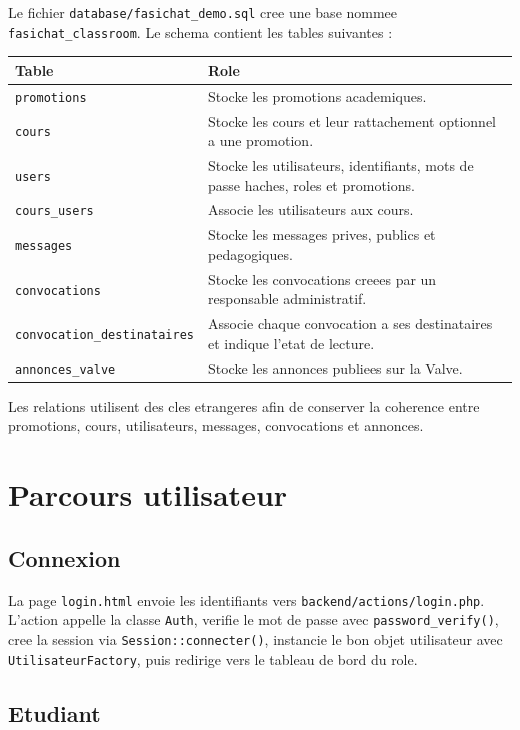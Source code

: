 \documentclass[12pt,a4paper]{article}
\begin{document}
Le fichier \texttt{database/fasichat\_demo.sql} cree une base nommee \texttt{fasichat\_classroom}. Le schema contient les tables suivantes :

\begin{longtable}{|p{4.5cm}|p{9.5cm}|}
\hline
\textbf{Table} & \textbf{Role} \\
\hline
\texttt{promotions} & Stocke les promotions academiques. \\
\hline
\texttt{cours} & Stocke les cours et leur rattachement optionnel a une promotion. \\
\hline
\texttt{users} & Stocke les utilisateurs, identifiants, mots de passe haches, roles et promotions. \\
\hline
\texttt{cours\_users} & Associe les utilisateurs aux cours. \\
\hline
\texttt{messages} & Stocke les messages prives, publics et pedagogiques. \\
\hline
\texttt{convocations} & Stocke les convocations creees par un responsable administratif. \\
\hline
\texttt{convocation\_destinataires} & Associe chaque convocation a ses destinataires et indique l'etat de lecture. \\
\hline
\texttt{annonces\_valve} & Stocke les annonces publiees sur la Valve. \\
\hline
\end{longtable}

Les relations utilisent des cles etrangeres afin de conserver la coherence entre promotions, cours, utilisateurs, messages, convocations et annonces.

\section{Parcours utilisateur}

\subsection{Connexion}

La page \texttt{login.html} envoie les identifiants vers \texttt{backend/actions/login.php}. L'action appelle la classe \texttt{Auth}, verifie le mot de passe avec \texttt{password\_verify()}, cree la session via \texttt{Session::connecter()}, instancie le bon objet utilisateur avec \texttt{UtilisateurFactory}, puis redirige vers le tableau de bord du role.

\subsection{Etudiant}
\end{document}
